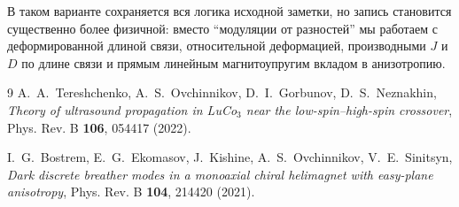 \documentclass[12pt,a4paper]{article}
\begin{document}
В таком варианте сохраняется вся логика исходной заметки, но запись становится существенно более физичной: вместо ``модуляции от разностей'' мы работаем с деформированной длиной связи, относительной деформацией, производными $J$ и $D$ по длине связи и прямым линейным магнитоупругим вкладом в анизотропию.

\begin{thebibliography}{9}
A.~A.~Tereshchenko, A.~S.~Ovchinnikov, D.~I.~Gorbunov, D.~S.~Neznakhin,
\textit{Theory of ultrasound propagation in LuCo$_3$ near the low-spin--high-spin crossover},
Phys. Rev. B \textbf{106}, 054417 (2022).

I.~G.~Bostrem, E.~G.~Ekomasov, J.~Kishine, A.~S.~Ovchinnikov, V.~E.~Sinitsyn,
\textit{Dark discrete breather modes in a monoaxial chiral helimagnet with easy-plane anisotropy},
Phys. Rev. B \textbf{104}, 214420 (2021).
\end{thebibliography}
\end{document}
